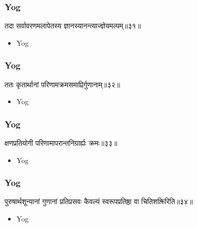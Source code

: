 \begin{frame}[fragile]\frametitle{Yog}
\begin{sanskrit}
तदा सर्वावरणमलापेतस्य ज्ञानस्यानन्त्याज्ज्ञेयमल्पम्॥३१॥
\end{sanskrit}
	\begin{itemize}
	\item Yog 
	\end{itemize}
\end{frame}



\begin{frame}[fragile]\frametitle{Yog}
\begin{sanskrit}
ततः कृतार्थानां परिणामक्रमसमाप्तिर्गुणानाम्॥३२॥
\end{sanskrit}
	\begin{itemize}
	\item Yog 
	\end{itemize}
\end{frame}


\begin{frame}[fragile]\frametitle{Yog}
\begin{sanskrit}
क्षणप्रतियोगी परिणामापरान्तनिग्रार्ह्यः क्रमः॥३३॥
\end{sanskrit}
	\begin{itemize}
	\item Yog 
	\end{itemize}
\end{frame}

\begin{frame}[fragile]\frametitle{Yog}
\begin{sanskrit}
पुरुषार्थशून्यानां गुणानां प्रतिप्रसवः कैवल्यं स्वरूपप्रतिष्ठा वा चितिशक्तिरिति॥३४॥
\end{sanskrit}
	\begin{itemize}
	\item Yog 
	\end{itemize}
\end{frame}

